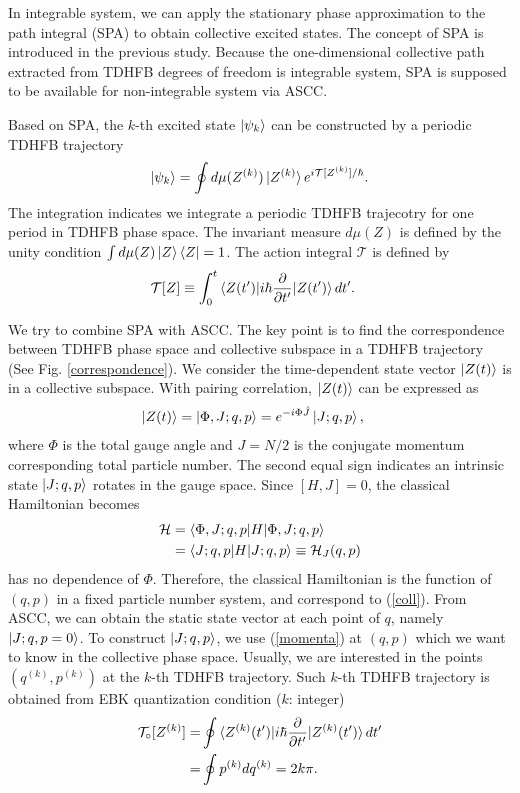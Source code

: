 \documentclass[%
superscriptaddress,
showpacs,
nofootinbib,
amsmath,amssymb,
aps,
prc,
twocolumn,
floatfix ]%
{revtex4-1}
\begin{document}
In integrable system, we can apply the stationary phase approximation to the path integral (SPA) to obtain collective excited states. The concept of SPA is introduced in the previous study. Because the one-dimensional collective path extracted from TDHFB degrees of freedom is integrable system, SPA is supposed to be available for non-integrable system via ASCC. \par
Based on SPA, the $k$-th excited state $\ket{\psi_k}$ can be constructed by a periodic TDHFB trajectory
\begin{equation}
	\ket{\psi_k} = \oint d\mu(Z^{(k)}) \ket{Z^{(k)}}
	e^{i\mathcal{T}[Z^{(k)}]/\hbar} .
	\label{SPA}
\end{equation}
The integration indicates we integrate a periodic TDHFB trajecotry for one period in TDHFB phase space. The invariant measure $d\mu(Z)$ is defined by the unity condition $\int d\mu(Z) \ket{Z}\bra{Z} = 1$. The action integral $\mathcal{T}$ is defined by
\begin{align}
\mathcal{T}[Z] &\equiv
\int_{0}^{t} \braket{Z(t')| i\hbar\frac{\partial}{\partial t'}
	|Z(t')} dt' .
\label{tau}
\end{align}

We try to combine SPA with ASCC. The key point is to find the correspondence between TDHFB phase space and collective subspace in a TDHFB trajectory (See Fig. \ref{correspondence}). We consider the time-dependent state vector $\ket{Z(t)}$ is in a collective subspace. With pairing correlation, $\ket{Z(t)}$ can be expressed as
\begin{align}
 \ket{Z(t)} &= \ket{\Phi,J;q,p} = e^{-i\Phi \hat{J}} \ket{J;q,p} ,
 \label{GCS}
\end{align}
where $\Phi$ is the total gauge angle and $J=N/2$ is the conjugate momentum corresponding total particle number. The second equal sign indicates an intrinsic state $\ket{J;q,p}$ rotates in the gauge space. Since $[H,J]=0$, the classical Hamiltonian 
becomes
\begin{align}
 \mathcal{H} &= \braket{\Phi,J;q,p|H|\Phi,J;q,p} \nonumber \\
 &= \braket{J;q,p|H|J;q,p} \equiv \mathcal{H}_J(q,p)
\end{align}  
has no dependence of $\Phi$. Therefore, the classical Hamiltonian is the function of $(q,p)$ in a fixed particle number system, and correspond to (\ref{coll}). From ASCC, we can obtain the static state vector at each point of $q$, namely $\ket{J;q,p=0}$. To construct $\ket{J;q,p}$, we use (\ref{momenta}) at $(q,p)$ which we want to know in the collective phase space. Usually, we are interested in the points $(q^{(k)},p^{(k)})$ at the $k$-th TDHFB trajectory. Such $k$-th TDHFB trajectory is obtained from EBK quantization condition ($k$: integer)
\begin{align}
	\mathcal{T}_\circ[Z^{(k)}]=&
	\oint \braket{Z^{(k)}(t')| i\hbar\frac{\partial}{\partial t'} |Z^{(k)}(t')} dt' \nonumber \\
	=& \oint p^{(k)} dq^{(k)} = 2k\pi .
	\label{EBK}
\end{align}
\end{document}
